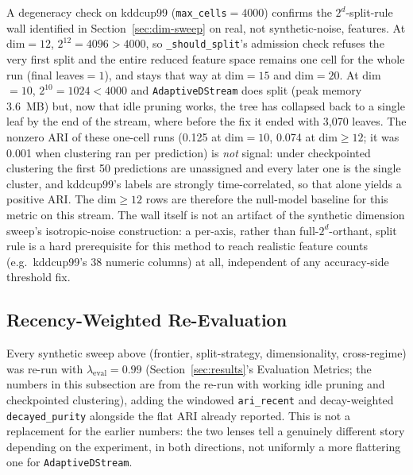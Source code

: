 \documentclass[11pt]{article}
\begin{document}
A degeneracy check on kddcup99 (\texttt{max\_cells}$=4000$) confirms the $2^d$-split-rule wall identified in Section~\ref{sec:dim-sweep} on real, not synthetic-noise, features. At dim$=12$, $2^{12}=4096 > 4000$, so \texttt{\_should\_split}'s admission check refuses the very first split and the entire reduced feature space remains one cell for the whole run (final leaves$=1$), and stays that way at dim$=15$ and dim$=20$. At dim$=10$, $2^{10}=1024 < 4000$ and \texttt{AdaptiveDStream} does split (peak memory 3.6~MB) but, now that idle pruning works, the tree has collapsed back to a single leaf by the end of the stream, where before the fix it ended with 3{,}070 leaves. The nonzero ARI of these one-cell runs (0.125 at dim$=10$, 0.074 at dim$\geq 12$; it was 0.001 when clustering ran per prediction) is \emph{not} signal: under checkpointed clustering the first 50 predictions are unassigned and every later one is the single cluster, and kddcup99's labels are strongly time-correlated, so that alone yields a positive ARI. The dim$\geq 12$ rows are therefore the null-model baseline for this metric on this stream. The wall itself is not an artifact of the synthetic dimension sweep's isotropic-noise construction: a per-axis, rather than full-$2^d$-orthant, split rule is a hard prerequisite for this method to reach realistic feature counts (e.g.\ kddcup99's 38 numeric columns) at all, independent of any accuracy-side threshold fix.

\subsection{Recency-Weighted Re-Evaluation}
\label{sec:recency-reeval}

Every synthetic sweep above (frontier, split-strategy, dimensionality, cross-regime) was re-run with $\lambda_{\text{eval}} = 0.99$ (Section~\ref{sec:results}'s Evaluation Metrics; the numbers in this subsection are from the re-run with working idle pruning and checkpointed clustering), adding the windowed \texttt{ari\_recent} and decay-weighted \texttt{decayed\_purity} alongside the flat ARI already reported. This is not a replacement for the earlier numbers: the two lenses tell a genuinely different story depending on the experiment, in both directions, not uniformly a more flattering one for \texttt{AdaptiveDStream}.
\end{document}
